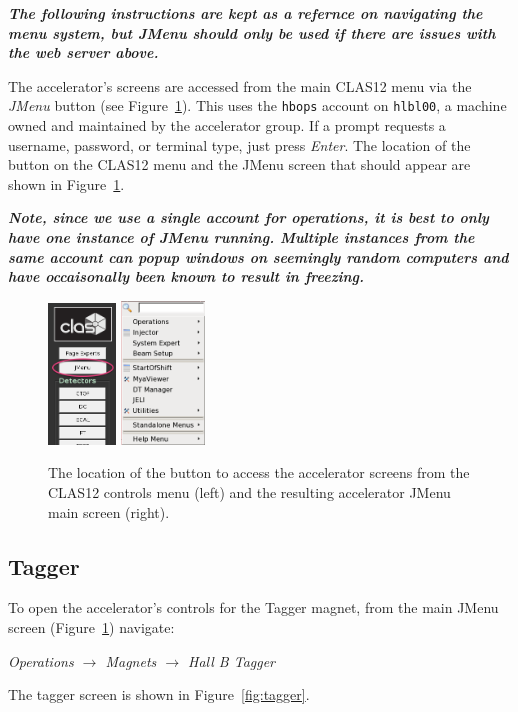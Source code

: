\documentclass[amsmath,amssymb,notitlepage,11pt]{revtex4}
\begin{document}
{\em\bf The following instructions are kept as a refernce on navigating the menu system, but JMenu should only be used if there are issues with the web server above.}

The accelerator's screens are accessed from the main CLAS12 menu via the {\em JMenu} button (see Figure~\ref{fig:jmenu}).  This uses the \texttt{hbops} account on \texttt{hlbl00}, a machine owned and maintained by the accelerator group.  If a prompt requests a username, password, or terminal type, just press {\em Enter}.  The location of the button on the CLAS12 menu and the JMenu screen that should appear are shown in Figure~\ref{fig:jmenu}.

{\bf\em Note, since we use a single account for operations, it is best to only have one instance of JMenu running.  Multiple instances from the same account can popup windows on seemingly random computers and have occaisonally been known to result in freezing.}
\begin{figure}[htbp]\centering
  \includegraphics[width=0.16\textwidth]{pics/clas12jmenu}
  \includegraphics[width=0.2\textwidth]{pics/jmenu}
  \caption{The location of the button to access the accelerator screens from the CLAS12 controls menu (left) and the resulting accelerator JMenu main screen (right).\label{fig:jmenu}}
\end{figure}
    \subsection{Tagger}
To open the accelerator's controls for the Tagger magnet, from the main JMenu screen (Figure~\ref{fig:jmenu}) navigate:
\begin{center}{\em Operations $\to$ Magnets $\to$ Hall B Tagger}\end{center}
The tagger screen is shown in Figure~\ref{fig:tagger}.
\end{document}
